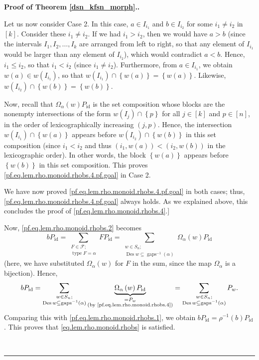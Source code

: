 \documentclass[12pt]{article}
\theoremstyle{definition}%
\theoremstyle{definition}%
\theoremstyle{remark}%
\newcommand{\tup}[1]{\left( #1 \right)}
\newcommand{\interval}[1]{\left[ #1 \right]} %
\newcommand{\set}[1]{\left\{ #1 \right\}}
\newcommand{\CF}{\mathcal{F}}
\newcommand{\Omal}{\Omega_{\alpha}}
\newcommand{\Des}{\operatorname{Des}}
\newcommand{\gaps}{\operatorname{gaps}}
\newcommand{\type}{\operatorname{type}}
\newcommand{\id}{\operatorname{id}}
\newenvironment{proof}[1][Proof]{\noindent\textbf{#1.} }{\ \rule{0.5em}{0.5em}}
\begin{document}
\begin{proof}[Proof of Theorem \ref{dsn_kfsn_morph}.]
\begin{enumerate}
Let us now consider Case 2. In this case, $a\in I_{i_{1}}$ and $b\in I_{i_{2}%
}$ for some $i_{1}\neq i_{2}$ in $\interval{k}$. Consider these
$i_{1}\neq i_{2}$. If we had $i_{1}>i_{2}$, then we would have $a>b$ (since
the intervals $I_{1},I_{2},\ldots,I_{k}$ are arranged from left to right, so
that any element of $I_{i_{1}}$ would be larger than any element of $I_{i_{2}}$),
which would contradict $a<b$. Hence, $i_{1}\leq i_{2}$, so that $i_{1}<i_{2}$
(since $i_{1}\neq i_{2}$). Furthermore, from $a\in I_{i_{1}}$, we obtain
$w\tup{a}   \in w\left(  I_{i_{1}}\right)$, so that $w\left(
I_{i_{1}}\right)  \cap\set{w\tup{a}}  = \set{w\tup{a}}$.
Likewise, $w\left(  I_{i_{2}}\right)  \cap \set{w\tup{b}}
= \set{w\tup{b}}$.

Now, recall that $\Omal \tup{w} P_{\id}$ is
the set composition whose blocks are the nonempty intersections of the form
$w\left(  I_{j}\right)  \cap \set{p}$ for all $j\in
\interval{k}$ and $p\in\interval{n}$, in the order of lexicographically
increasing $\left(  j,p\right)$. Hence, the intersection
$w\left(  I_{i_{1} }\right)  \cap\set{w\tup{a}}$ appears
before $w\left(  I_{i_{2}}\right)  \cap\set{w\tup{b}}$ in
this set composition (since $i_{1}<i_{2}$ and thus
$\tup{i_1, w\tup{a}} < \tup{i_2, w\tup{b}}$
in the lexicographic order). In other words, the
block $\set{w\tup{a}}$ appears before $\set{w\tup{b}}$
in this set composition. This proves
\eqref{pf.eq.lem.rho.monoid.rhobs.4.pf.goal} in Case 2.

We have now proved \eqref{pf.eq.lem.rho.monoid.rhobs.4.pf.goal}
in both cases;
thus, \eqref{pf.eq.lem.rho.monoid.rhobs.4.pf.goal} always holds.
As we explained above, this concludes the proof of
\eqref{pf.eq.lem.rho.monoid.rhobs.4}.]

Now, \eqref{pf.eq.lem.rho.monoid.rhobs.2} becomes
\[
bP_{\id}
= \sum\limits_{\substack{F\in\CF;\\
\type F=\alpha}}FP_{\id}
= \sum\limits_{\substack{w\in S_n;\\
\Des w\subseteq \gaps^{-1}\tup{\alpha}  }}
\Omal\tup{w}  P_{\id}
\]
(here, we have substituted $\Omal \tup{w}$ for $F$ in the
sum, since the map $\Omal$ is a bijection). Hence,
\[
bP_{\id}=\sum\limits_{\substack{w\in S_n;\\
\Des w\subseteq\gaps^{-1} \tup{\alpha}  }}
\underbrace{\Omal \tup{w}
P_{\id}}_{\substack{=P_{w}\\\text{(by
\eqref{pf.eq.lem.rho.monoid.rhobs.4})}}}
= \sum\limits_{\substack{w\in S_n;\\
\Des w\subseteq\gaps^{-1} \tup{\alpha} }}P_{w}.
\]
Comparing this with \eqref{pf.eq.lem.rho.monoid.rhobs.1},
we obtain $bP_{\id} = \rho^{-1}\tup{b}  P_{\id}$.
This proves that \eqref{eq.lem.rho.monoid.rhobs} is satisfied.
\end{enumerate}


\end{proof}
\end{document}
